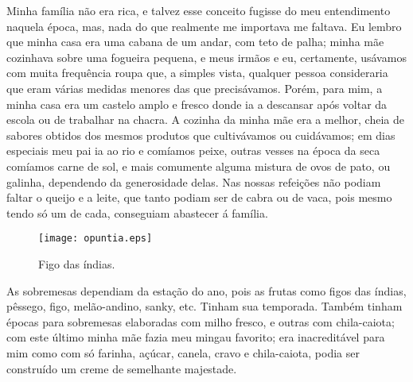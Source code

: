 Minha família não era rica, e talvez esse conceito fugisse do meu entendimento naquela época, mas, nada do que realmente me importava me faltava.
Eu lembro que minha casa era uma cabana de um andar, com teto de palha; minha mãe cozinhava sobre uma fogueira pequena, e meus irmãos e eu, certamente, usávamos com muita frequência roupa que, a simples vista, qualquer pessoa consideraria que eram várias medidas menores das que precisávamos.
Porém, para mim, a minha casa era um castelo amplo e fresco donde ia a descansar após voltar da escola ou de trabalhar na chacra. 
A cozinha da minha mãe era a melhor, cheia de sabores obtidos dos mesmos produtos que cultivávamos ou cuidávamos; em dias especiais meu pai ia ao rio e comíamos peixe, outras vesses na época da seca comíamos carne de sol, e mais comumente alguma mistura de ovos de pato, ou galinha, dependendo da generosidade delas.
Nas nossas refeições não podiam faltar o queijo e a leite, que tanto podiam ser de cabra ou de vaca, pois mesmo tendo só um de cada, conseguiam abastecer á família.
\begin{wrapfigure}{r}{0.35\textwidth}
  \vspace{-10pt}
  \begin{center}
    \texttt{[image: opuntia.eps]}
    \caption{Figo das índias.}
  \end{center}
  \vspace{-30pt}
\end{wrapfigure}
As sobremesas dependiam da estação do ano, pois as frutas como figos das índias, pêssego, figo, melão-andino, sanky, etc. Tinham sua temporada. Também tinham épocas para sobremesas elaboradas com milho fresco, e outras com chila-caiota; com este último minha mãe fazia meu mingau favorito; era inacreditável para mim como com só farinha, açúcar, canela, cravo e chila-caiota, podia ser construído um creme de semelhante majestade.

